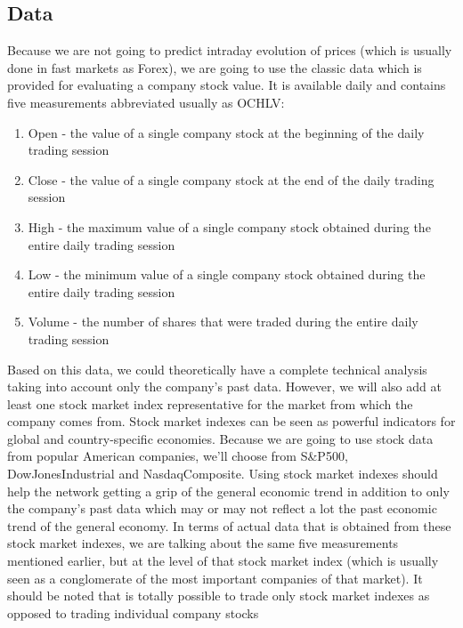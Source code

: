 \subsection{Data}
Because we are not going to predict intraday evolution of prices (which is usually done in fast markets as Forex), we are going to use the classic data which is provided for evaluating a company stock value. It is available daily and contains five measurements abbreviated usually as OCHLV:
\begin{enumerate}
    \item Open - the value of a single company stock at the beginning of the daily trading session
    \item Close - the value of a single company stock at the end of the daily trading session
    \item High - the maximum value of a single company stock obtained during the entire daily trading session
    \item Low - the minimum value of a single company stock obtained during the entire daily trading session
    \item Volume - the number of shares that were traded during the entire daily trading session
\end{enumerate}
Based on this data, we could theoretically have a complete technical analysis taking into account only the company's past data. However, we will also add at least one stock market index representative for the market from which the company comes from. Stock market indexes can be seen as powerful indicators for global and country-specific economies. Because we are going to use stock data from popular American companies, we'll choose from S\&P500, DowJonesIndustrial and NasdaqComposite. Using stock market indexes should help the network getting a grip of the general economic trend in addition to only the company's past data which may or may not reflect a lot the past economic trend of the general economy. In terms of actual data that is obtained from these stock market indexes, we are talking about the same five measurements mentioned earlier, but at the level of that stock market index (which is usually seen as a conglomerate of the most important companies of that market). It should be noted that is totally possible to trade only stock market indexes as opposed to trading individual company stocks

